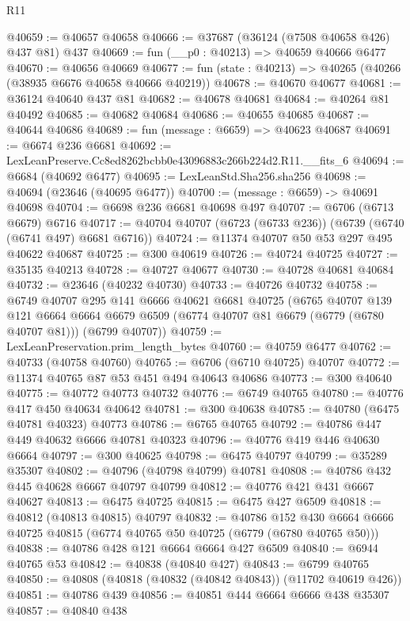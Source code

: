 \begin{lexlean}{R11}
\begin{coremodule}
@40659 := @40657 @40658
@40666 := @37687 (@36124 (@7508 @40658 @426) @437 @81) @437
@40669 := fun (__p0 : @40213) => @40659 @40666 @6477
@40670 := @40656 @40669
@40677 := fun (state : @40213) => @40265 (@40266 (@38935 @6676 @40658 @40666 @40219))
@40678 := @40670 @40677
@40681 := @36124 @40640 @437 @81
@40682 := @40678 @40681
@40684 := @40264 @81 @40492
@40685 := @40682 @40684
@40686 := @40655 @40685
@40687 := @40644 @40686
@40689 := fun (message : @6659) => @40623 @40687
@40691 := @6674 @236 @6681
@40692 := LexLeanPreserve.Cc8ed8262bcbb0e43096883c266b224d2.R11.__fits_6
@40694 := @6684 (@40692 @6477)
@40695 := LexLeanStd.Sha256.sha256
@40698 := @40694 (@23646 (@40695 @6477))
@40700 := (message : @6659) -> @40691 @40698
@40704 := @6698 @236 @6681 @40698 @497
@40707 := @6706 (@6713 @6679) @6716
@40717 := @40704 @40707 (@6723 (@6733 @236)) (@6739 (@6740 (@6741 @497) @6681 @6716))
@40724 := @11374 @40707 @50 @53 @297 @495 @40622 @40687
@40725 := @300 @40619
@40726 := @40724 @40725
@40727 := @35135 @40213
@40728 := @40727 @40677
@40730 := @40728 @40681 @40684
@40732 := @23646 (@40232 @40730)
@40733 := @40726 @40732
@40758 := @6749
    @40707
    @295
    @141
    @6666
    @40621
    @6681
    @40725
    (@6765
      @40707
      @139
      @121
      @6664
      @6664
      @6679
      @6509
      (@6774 @40707 @81 @6679 (@6779 (@6780 @40707 @81)))
      (@6799 @40707))
@40759 := LexLeanPreservation.prim_length_bytes
@40760 := @40759 @6477
@40762 := @40733 (@40758 @40760)
@40765 := @6706 (@6710 @40725) @40707
@40772 := @11374 @40765 @87 @53 @451 @494 @40643 @40686
@40773 := @300 @40640
@40775 := @40772 @40773 @40732
@40776 := @6749 @40765
@40780 := @40776 @417 @450 @40634 @40642
@40781 := @300 @40638
@40785 := @40780 (@6475 @40781 @40323) @40773
@40786 := @6765 @40765
@40792 := @40786 @447 @449 @40632 @6666 @40781 @40323
@40796 := @40776 @419 @446 @40630 @6664
@40797 := @300 @40625
@40798 := @6475 @40797
@40799 := @35289 @35307
@40802 := @40796 (@40798 @40799) @40781
@40808 := @40786 @432 @445 @40628 @6667 @40797 @40799
@40812 := @40776 @421 @431 @6667 @40627
@40813 := @6475 @40725
@40815 := @6475 @427 @6509
@40818 := @40812 (@40813 @40815) @40797
@40832 := @40786
    @152
    @430
    @6664
    @6666
    @40725
    @40815
    (@6774 @40765 @50 @40725 (@6779 (@6780 @40765 @50)))
@40838 := @40786 @428 @121 @6664 @6664 @427 @6509
@40840 := @6944 @40765 @53
@40842 := @40838 (@40840 @427)
@40843 := @6799 @40765
@40850 := @40808 (@40818 (@40832 (@40842 @40843)) (@11702 @40619 @426))
@40851 := @40786 @439
@40856 := @40851 @444 @6664 @6666 @438 @35307
@40857 := @40840 @438

\end{coremodule}
\end{lexlean}
